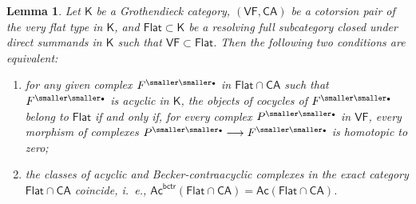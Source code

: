 \documentclass[10pt,a4paper]{amsart}
\newtheorem{lem}{Lemma}
\newcommand{\Ac}{\mathsf{Ac}}
\newcommand{\CA}{\mathsf{CA}}
\newcommand{\Flat}{\mathsf{Flat}}
\newcommand{\VF}{\mathsf{VF}}
\newcommand{\bctr}{\mathsf{bctr}}
\newcommand{\bu}{{\text{\smaller\smaller$\scriptstyle\bullet$}}}
\newcommand{\rarrow}{\longrightarrow}
\newcommand{\sK}{\mathsf K}
\begin{document}
\begin{lem} \label{ac=ac-bctr-equivalent-conditions}
 Let\/ $\sK$ be a Grothendieck category, $(\VF,\CA)$ be a cotorsion pair
of the very flat type in\/ $\sK$, and\/ $\Flat\subset\sK$ be a resolving
full subcategory closed under direct summands in\/ $\sK$ such that\/
$\VF\subset\Flat$.
 Then the following two conditions are equivalent:
\begin{enumerate}
\item for any given complex $F^\bu$ in\/ $\Flat\cap\CA$ such that
$F^\bu$ is acyclic in\/ $\sK$, the objects of cocycles of $F^\bu$ belong
to\/ $\Flat$ if and only if, for every complex $P^\bu$ in\/ $\VF$,
every morphism of complexes $P^\bu\rarrow F^\bu$ is homotopic to zero;
\item the classes of acyclic and Becker-contraacyclic complexes in
the exact category\/ $\Flat\cap\CA$ coincide, i.~e.,
$\Ac^\bctr(\Flat\cap\CA)=\Ac(\Flat\cap\CA)$.
\end{enumerate}
\end{lem}
\end{document}
